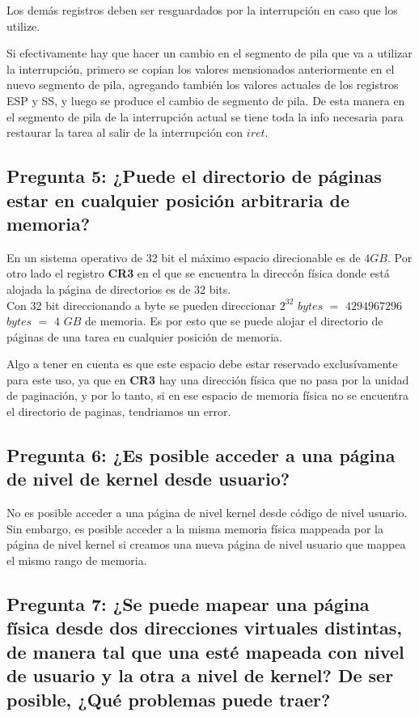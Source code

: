 \documentclass[a4paper,10pt,twoside]{article}
\begin{document}
Los demás registros deben ser resguardados por la interrupción en caso que los utilize.

Si efectivamente hay que hacer un cambio en el segmento de pila que va a utilizar la interrupción, primero se copian los valores mensionados anteriormente en el nuevo segmento de pila, agregando también los valores actuales de los registros ESP y SS, y luego se produce el cambio de segmento de pila. De esta manera en el segmento de pila de la interrupción actual se tiene toda la info necesaria para restaurar la tarea al salir de la interrupción con $iret$.


\subsection{Pregunta 5: ¿Puede el directorio de páginas estar en cualquier posición arbitraria de memoria?}
En un sistema operativo de 32 bit el máximo espacio direcionable es de $4GB$. Por otro lado el registro \textbf{CR3} en el que se encuentra la direccón física donde está alojada la página de directorios es de 32 bits. \\

Con 32 bit direccionando a byte se pueden direccionar $2^{32}$ $bytes$ $=$ $4294967296$ $bytes$ $=$ $4$ $GB$ de memoria. Es por esto que se puede alojar el directorio de páginas de una tarea en cualquier posición de memoria. 

Algo a tener en cuenta es que este espacio debe estar reservado exclusívamente para este uso, ya que en \textbf{CR3} hay una dirección física que no pasa por la unidad de paginación, y por lo tanto, si en ese espacio de memoria física no se encuentra el directorio de paginas, tendriamos un error.


\subsection{Pregunta 6: ¿Es posible acceder a una página de nivel de kernel desde usuario?}

No es posible acceder a una página de nivel kernel desde código de nivel usuario. Sin embargo, es posible acceder a la misma memoria física mappeada por la página de nivel kernel si creamos una nueva página de nivel usuario que mappea el mismo rango de memoria.


\subsection{Pregunta 7: ¿Se puede mapear una página física desde dos direcciones virtuales distintas, de manera tal que una esté mapeada con nivel de usuario y la otra a nivel de kernel? De ser posible, ¿Qué problemas puede traer?}
\end{document}
